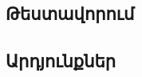 {
    \subsection{Թեստավորում}\label{subsec:testing}
    

    \subsection{Արդյունքներ}\label{subsec:results}
    
}
